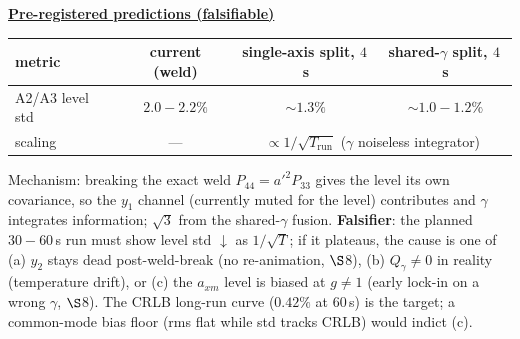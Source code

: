\documentclass[11pt,a4paper,fontset=none]{ctexart}
\newcommand{\hd}[1]{\par\medskip\noindent\underline{\textbf{#1}}\par\nobreak\vspace{0.2ex}}
\begin{document}
\hd{Pre-registered predictions (falsifiable)}
\begin{center}
\begin{tabular}{lccc}
\toprule
metric & current (weld) & single-axis split, $4$\,s & shared-$\gamma$ split, $4$\,s\\
\midrule
A2/A3 level std & $2.0\!-\!2.2\%$ & $\sim\!1.3\%$ & $\sim\!1.0\!-\!1.2\%$\\
scaling & --- & \multicolumn{2}{c}{$\propto 1/\sqrt{T_{\mathrm{run}}}$ ($\gamma$ noiseless integrator)}\\
\bottomrule
\end{tabular}
\end{center}
Mechanism: breaking the exact weld $P_{44}=a'^2P_{33}$ gives the level its own covariance, so the $y_1$ channel (currently muted for the level) contributes and $\gamma$ integrates information; $\sqrt3$ from the shared-$\gamma$ fusion. \textbf{Falsifier}: the planned $30\!-\!60$\,s run must show level std $\downarrow$ as $1/\sqrt{T}$; if it plateaus, the cause is one of (a) $y_2$ stays dead post-weld-break (no re-animation, $\S$8), (b) $Q_\gamma\ne0$ in reality (temperature drift), or (c) the $a_{xm}$ level is biased at $g\ne1$ (early lock-in on a wrong $\gamma$, $\S$8). The CRLB long-run curve ($0.42\%$ at $60$\,s) is the target; a common-mode bias floor (rms flat while std tracks CRLB) would indict (c).
\end{document}
